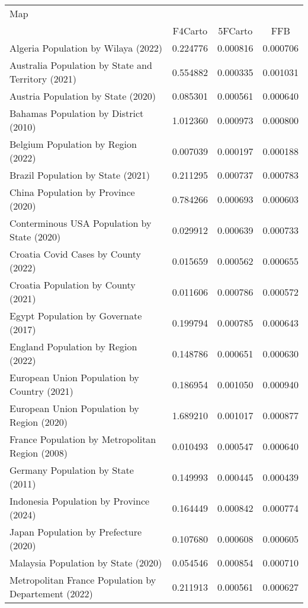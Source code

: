\begin{tabular}{lccc}
\toprule
Map &  \\
\cmidrule(lr){2-4}
     & F4Carto & 5FCarto & FFB \\
\midrule

Algeria Population by Wilaya (2022) & 0.224776 & 0.000816 & 0.000706 \\
Australia Population by State and Territory (2021) & 0.554882 & 0.000335 & 0.001031 \\
Austria Population by State (2020) & 0.085301 & 0.000561 & 0.000640 \\
Bahamas Population by District (2010) & 1.012360 & 0.000973 & 0.000800 \\
Belgium Population by Region (2022) & 0.007039 & 0.000197 & 0.000188 \\
Brazil Population by State (2021) & 0.211295 & 0.000737 & 0.000783 \\
China Population by Province (2020) & 0.784266 & 0.000693 & 0.000603 \\
Conterminous USA Population by State (2020) & 0.029912 & 0.000639 & 0.000733 \\
Croatia Covid Cases by County (2022) & 0.015659 & 0.000562 & 0.000655 \\
Croatia Population by County (2021) & 0.011606 & 0.000786 & 0.000572 \\
Egypt Population by Governate (2017) & 0.199794 & 0.000785 & 0.000643 \\
England Population by Region (2022) & 0.148786 & 0.000651 & 0.000630 \\
European Union Population by Country (2021) & 0.186954 & 0.001050 & 0.000940 \\
European Union Population by Region (2020) & 1.689210 & 0.001017 & 0.000877 \\
France Population by Metropolitan Region (2008) & 0.010493 & 0.000547 & 0.000640 \\
Germany Population by State (2011) & 0.149993 & 0.000445 & 0.000439 \\
Indonesia Population by Province (2024) & 0.164449 & 0.000842 & 0.000774 \\
Japan Population by Prefecture (2020) & 0.107680 & 0.000608 & 0.000605 \\
Malaysia Population by State (2020) & 0.054546 & 0.000854 & 0.000710 \\
Metropolitan France Population by Departement (2022) & 0.211913 & 0.000561 & 0.000627 \\

\end{tabular}
